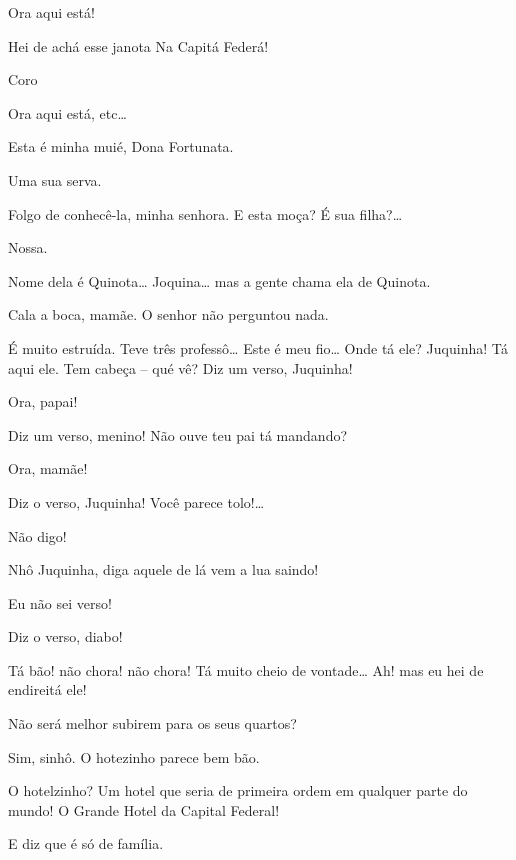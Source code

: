  Ora aqui está!

 Hei de achá esse janota
 Na Capitá Federá!

 Coro

 Ora aqui está, etc\ldots{}

Esta é minha muié, Dona Fortunata.

 Uma sua serva. 

 Folgo de conhecê-la, minha senhora. E esta moça? É sua
filha?\ldots{}

 Nossa.

 Nome dela é Quinota\ldots{} Joquina\ldots{} mas a gente chama ela de
Quinota.

 Cala a boca, mamãe. O senhor não perguntou nada.

 É muito estruída. Teve três professô\ldots{} Este é meu fio\ldots{}
 Onde tá ele? Juquinha!  Tá aqui ele. Tem cabeça -- qué vê? Diz um verso, Juquinha!

 Ora, papai!

 Diz um verso, menino! Não ouve teu pai tá mandando?

 Ora, mamãe!

 Diz o verso, Juquinha! Você parece tolo!\ldots{}

 Não digo!

 Nhô Juquinha, diga aquele de lá vem a lua saindo!

 Eu não sei verso!

 Diz o verso, diabo! 

  Tá bão! não chora! não chora!
 Tá muito cheio de vontade\ldots{} Ah! mas eu hei de endireitá ele!

 Não será melhor subirem para os seus quartos?

 Sim, sinhô.  O hotezinho parece bem
bão.

 O hotelzinho? Um hotel que seria de primeira ordem em qualquer
parte do mundo! O Grande Hotel da Capital Federal!

 E diz que é só de família.

